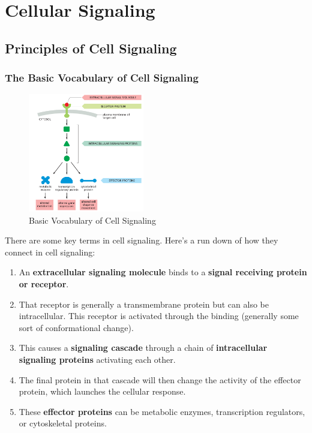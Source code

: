 \documentclass[../main.tex]{subfiles}
\begin{document}
	

\section{Cellular Signaling}

\subsection{Principles of Cell Signaling}

\subsubsection{The Basic Vocabulary of Cell Signaling}

\begin{figure}[h]
	\centering
	\includegraphics[width=0.45\textwidth]{Basic_overview}
	\caption{Basic Vocabulary of Cell Signaling}
\end{figure}

There are some key terms in cell signaling. Here's a run down of how they connect in cell signaling:
\begin{enumerate}
	\item An \textbf{extracellular signaling molecule} binds to a \textbf{signal receiving protein or receptor}.
	\item That receptor is generally a transmembrane protein but can also be intracellular. This receptor is activated through the binding (generally some sort of conformational change).
	\item This causes a \textbf{signaling cascade} through a chain of \textbf{intracellular signaling proteins} activating each other.
	\item The final protein in that cascade will then change the activity of the effector protein, which launches the cellular response.
	\item These \textbf{effector proteins} can be metabolic enzymes, transcription regulators, or cytoskeletal proteins.
\end{enumerate}
\end{document}
